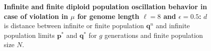 \begin{figure}[H]
\begin{center}
\hspace{5pt}
\hspace{5pt}


\caption{\textbf{Infinite and finite diploid population oscillation behavior in case of violation in $\mu$ for genome length $\ell = 8$ and $\epsilon = 0.5$:} $d$ is
  distance between infinite or finite population ${\bm q}^n$ and infinite
  population limits ${{\bm p}^\ast}$ and ${{\bm q}^{\ast}}$ for $g$ generations and finite population size $N$.}
\label{oscillation_8d_vio_mu_0.5}
\end{center}
\end{figure}


